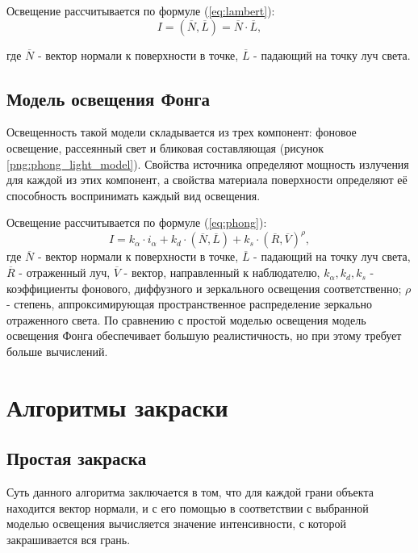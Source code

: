 Освещение рассчитывается по формуле (\ref{eq:lambert}):
\begin{equation}
	I = (\overline{N}, \overline{L}) = \overline{N} \cdot \overline{L},
	\label{eq:lambert}
\end{equation}

где $\overline{N}$ - вектор нормали к поверхности в точке, $\overline{L}$ - падающий на точку луч света.


\subsection{Модель освещения Фонга}
Освещенность такой модели складывается из трех компонент: фоновое освещение, рассеянный свет и бликовая составляющая (рисунок \ref{png:phong_light_model}). Свойства источника определяют мощность излучения для каждой из этих компонент, а свойства материала поверхности определяют её способность воспринимать каждый вид освещения.
\begin{figure}[H]
\end{figure}

Освещение рассчитывается по формуле (\ref{eq:phong}):
\begin{equation}
	I = k_{\alpha} \cdot i_\alpha + k_d \cdot (\overline{N}, \overline{L}) + k_s \cdot (\overline{R}, \overline{V})^\rho,
	\label{eq:phong}
\end{equation}
где $\overline{N}$ - вектор нормали к поверхности в точке, $\overline{L}$ - падающий на точку луч света, $\overline{R}$ - отраженный луч, $\overline{V}$ - вектор, направленный к наблюдателю, $k_\alpha, k_d, k_s$ - коэффициенты фонового, диффузного и зеркального освещения соответственно; $\rho$ - степень, аппроксимирующая пространственное распределение зеркально отраженного света. По сравнению с простой моделью освещения модель освещения Фонга обеспечивает большую реалистичность, но при этому требует больше вычислений.

\section{Алгоритмы закраски}
\subsection{Простая закраска}
Суть данного алгоритма заключается в том, что для каждой грани объекта находится вектор нормали, и с его помощью в соответствии с выбранной моделью освещения вычисляется значение интенсивности, с которой закрашивается вся грань.

